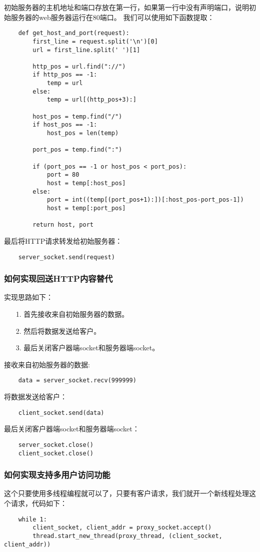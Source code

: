 \documentclass[a4paper,left=2.5cm,right=2.5cm,11pt]{article}
\begin{document}
	初始服务器的主机地址和端口存放在第一行，如果第一行中没有声明端口，说明初始服务器的web服务器运行在80端口。
	我们可以使用如下函数提取：
	\begin{lstlisting}
	def get_host_and_port(request):
		first_line = request.split('\n')[0]
		url = first_line.split(' ')[1]

		http_pos = url.find("://")
		if http_pos == -1:
			temp = url
		else:
			temp = url[(http_pos+3):]
		
		host_pos = temp.find("/")
		if host_pos == -1:
			host_pos = len(temp)

		port_pos = temp.find(":")

		if (port_pos == -1 or host_pos < port_pos):
			port = 80
			host = temp[:host_pos]
		else:
			port = int((temp[(port_pos+1):])[:host_pos-port_pos-1])
			host = temp[:port_pos]

		return host, port
	\end{lstlisting}
	
	最后将HTTP请求转发给初始服务器：
	\begin{lstlisting}
	server_socket.send(request)
	\end{lstlisting}

\subsubsection{如何实现回送HTTP内容替代}
	实现思路如下：
	\begin{itemize}
		\item[1.] 首先接收来自初始服务器的数据。
		\item[2.] 然后将数据发送给客户。
		\item[3.] 最后关闭客户器端socket和服务器端socket。
	\end{itemize}

	接收来自初始服务器的数据:
	\begin{lstlisting}
	data = server_socket.recv(999999)
	\end{lstlisting}

	将数据发送给客户：
	\begin{lstlisting}
	client_socket.send(data)
	\end{lstlisting}

	最后关闭客户器端socket和服务器端socket：
	\begin{lstlisting}
	server_socket.close()
	client_socket.close()
	\end{lstlisting}

\subsubsection{如何实现支持多用户访问功能}
	这个只要使用多线程编程就可以了，只要有客户请求，我们就开一个新线程处理这个请求，代码如下：
	\begin{lstlisting}
	while 1:
		client_socket, client_addr = proxy_socket.accept()
		thread.start_new_thread(proxy_thread, (client_socket, client_addr))
	\end{lstlisting}
\end{document}
